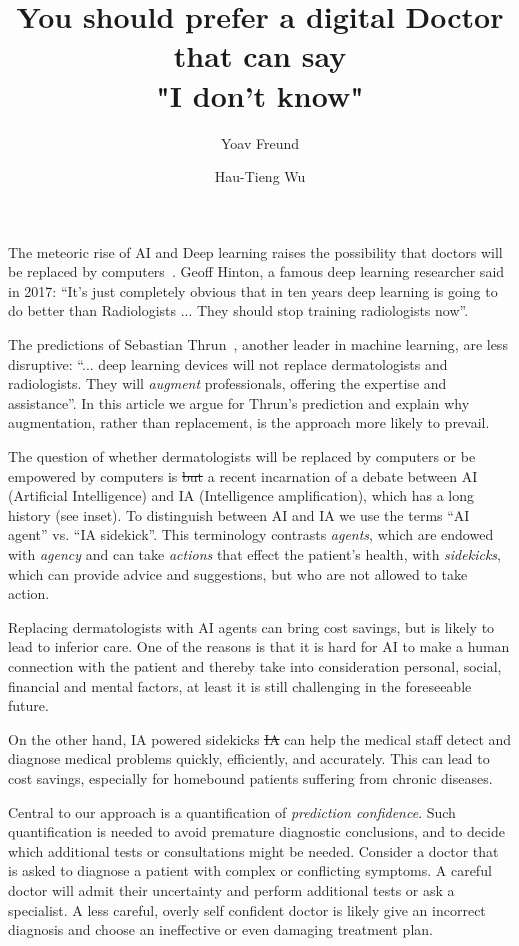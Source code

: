 \documentclass[11pt]{pnas-new}
\author[1]{Yoav Freund}
\author[2]{Hau-Tieng Wu}
\affil[1]{UCSD, Computer Science, San Diego, 92093, United States}
\affil[2]{Duke, Mathematics and Statistical Science, Durham, 27708, USA}
\title{You should prefer a digital Doctor that can say\\ "I don't know"}
\newlength{\strutheight}
\begin{document}
\settoheight{\strutheight}{\strut}

 
\maketitle


The meteoric rise of AI and Deep learning raises the possibility that
doctors will be replaced by computers~\cite{Mukherjee2017}. Geoff Hinton,
a famous deep learning researcher said in 2017: ``It's just completely
obvious that in ten years deep learning is going to do better than
Radiologists ... They should stop training radiologists now''.

The predictions of Sebastian
Thrun~\cite{Mukherjee2017,esteva2017dermatologist}, another leader in
machine learning, are less disruptive: ``... deep learning devices
will not replace dermatologists and radiologists. They will {\em
  augment} professionals, offering the expertise and assistance''. In
this article we argue for Thrun's prediction and explain why
augmentation, rather than replacement, is the approach more likely to
prevail.

 The question of whether dermatologists will be
replaced by computers or be empowered by computers is \sout{but} a recent
incarnation of a debate between AI (Artificial Intelligence) and IA
(Intelligence amplification), which has a long history (see inset). To
distinguish between AI and IA we use the terms ``AI agent'' vs. ``IA
sidekick''. This terminology contrasts {\em agents}, which are endowed
with {\em agency} and can take {\em actions} that effect the patient's
health, with {\em sidekicks}, which can provide advice and suggestions,
but who are not allowed to take action.

Replacing dermatologists with AI agents can bring cost savings,
but is likely to lead to inferior care. One of the reasons is that it
is hard for AI to make a human connection with the patient and thereby
take into consideration personal, social, financial and mental factors{\color{red}, at least it is still challenging in the foreseeable future}.

On the other hand, IA powered sidekicks \sout{IA} can help the medical staff
detect and diagnose medical problems quickly, efficiently, and
accurately. This can lead to cost savings, especially for homebound
patients suffering from chronic diseases.

Central to our approach is a quantification of {\em prediction
  confidence}. Such quantification is needed to avoid premature
diagnostic conclusions, and to decide which additional tests or
consultations might be needed. Consider a doctor that is asked
to diagnose a patient with complex or conflicting symptoms. A careful
doctor will admit their uncertainty and perform additional tests or
ask a specialist. A less careful, overly self confident doctor is
likely give an incorrect diagnosis and choose an ineffective or even damaging
treatment plan.
\end{document}
